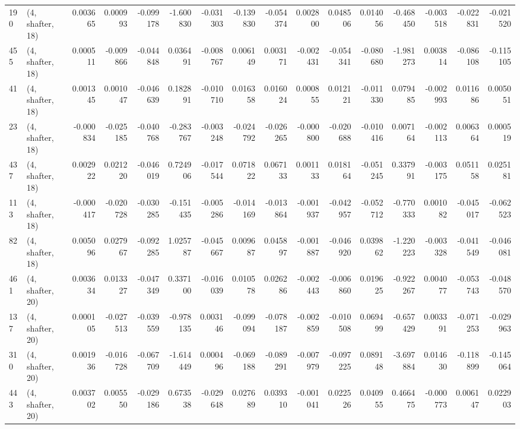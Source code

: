 \begin{tabular}{llrrrrrrrrrrrrrr}
190 &  (4, shafter, 18) &   0.003665 &  0.000993 & -0.099178 &  -1.600830 & -0.031303 &  -0.139830 & -0.054374 &  0.002800 &  0.048506 &  0.014056 &    -0.468450 &  -0.003518 &  -0.022831 &  -0.021520 \\
455 &  (4, shafter, 18) &   0.000511 & -0.009866 & -0.044848 &   0.036491 & -0.008767 &   0.006149 &  0.003171 & -0.002431 & -0.054341 & -0.080680 &    -1.981273 &   0.003814 &  -0.086108 &  -0.115105 \\
41  &  (4, shafter, 18) &   0.001345 &  0.001047 & -0.046639 &   0.182891 & -0.010710 &   0.016358 &  0.016024 &  0.000855 &  0.012121 & -0.011330 &     0.079485 &  -0.002993 &   0.011686 &   0.005051 \\
23  &  (4, shafter, 18) &  -0.000834 & -0.025185 & -0.040768 &  -0.283767 & -0.003248 &  -0.024792 & -0.026265 & -0.000800 & -0.020688 & -0.010416 &     0.007164 &  -0.002113 &   0.006364 &   0.000519 \\
437 &  (4, shafter, 18) &   0.002922 &  0.021220 & -0.046019 &   0.724906 & -0.017544 &   0.071822 &  0.067133 &  0.001133 &  0.018164 & -0.051245 &     0.337991 &  -0.003175 &   0.051158 &   0.025181 \\
113 &  (4, shafter, 18) &  -0.000417 & -0.020728 & -0.030285 &  -0.151435 & -0.005286 &  -0.014169 & -0.013864 & -0.001937 & -0.042957 & -0.052712 &    -0.770333 &   0.001082 &  -0.045017 &  -0.062523 \\
82  &  (4, shafter, 18) &   0.005096 &  0.027967 & -0.092285 &   1.025787 & -0.045667 &   0.009687 &  0.045897 & -0.001887 & -0.046920 &  0.039862 &    -1.220223 &  -0.003328 &  -0.041549 &  -0.046081 \\
461 &  (4, shafter, 20) &   0.003634 &  0.013327 & -0.047349 &   0.337100 & -0.016039 &   0.010578 &  0.026286 & -0.002443 & -0.006860 &  0.019625 &    -0.922267 &   0.004077 &  -0.053743 &  -0.048570 \\
137 &  (4, shafter, 20) &   0.000105 & -0.027513 & -0.039559 &  -0.978135 &  0.003146 &  -0.099094 & -0.078187 & -0.002859 & -0.010508 &  0.069499 &    -0.657429 &   0.003391 &  -0.071253 &  -0.029963 \\
310 &  (4, shafter, 20) &   0.001936 & -0.016728 & -0.067709 &  -1.614449 &  0.000496 &  -0.069188 & -0.089291 & -0.007979 & -0.097225 &  0.089148 &    -3.697884 &   0.014630 &  -0.118899 &  -0.145064 \\
443 &  (4, shafter, 20) &   0.003702 &  0.005550 & -0.029186 &   0.673538 & -0.029648 &   0.027689 &  0.039310 & -0.001041 &  0.022526 &  0.040955 &     0.466475 &  -0.000773 &   0.006147 &   0.022903 \\

\end{tabular}
